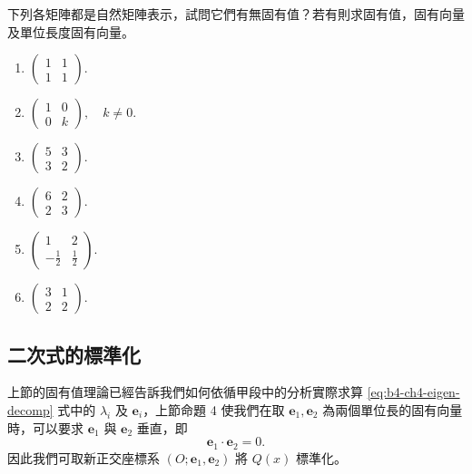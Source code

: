 下列各矩陣都是自然矩陣表示，試問它們有無固有值？若有則求固有值，固有向量及單位長度固有向量。

\begin{enumerate}
  \item $\begin{pmatrix} 1 & 1 \\ 1 & 1 \end{pmatrix}$.
  \item $\begin{pmatrix} 1 & 0 \\ 0 & k \end{pmatrix}, \quad k \ne 0$.
  \item $\begin{pmatrix} 5 & 3 \\ 3 & 2 \end{pmatrix}$.
  \item $\begin{pmatrix} 6 & 2 \\ 2 & 3 \end{pmatrix}$.
  \item $\begin{pmatrix} 1 & 2 \\ -\frac{1}{2} & \frac{1}{2} \end{pmatrix}$.
  \item $\begin{pmatrix} 3 & 1 \\ 2 & 2 \end{pmatrix}$.
\end{enumerate}


\subsection{二次式的標準化}\label{sec:b4-4-3}

上節的固有值理論已經告訴我們如何依循甲段中的分析實際求算 \eqref{eq:b4-ch4-eigen-decomp} 式中的 $\lambda_i$ 及 $\mathbf{e}_i$，上節命題 4 使我們在取 $\mathbf{e}_1, \mathbf{e}_2$ 為兩個單位長的固有向量時，可以要求 $\mathbf{e}_1$ 與 $\mathbf{e}_2$ 垂直，即
\[
\mathbf{e}_1 \cdot \mathbf{e}_2 = 0.
\]
因此我們可取新正交座標系 $(O; \mathbf{e}_1, \mathbf{e}_2)$ 將 $Q(x)$ 標準化。

